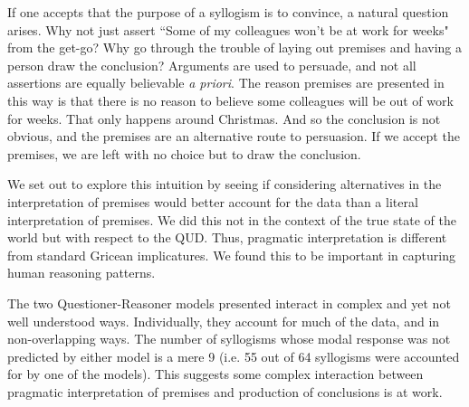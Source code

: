\documentclass[10pt,letterpaper]{article}
\begin{document}
If one accepts that the purpose of a syllogism is to convince, a natural question arises. Why not just assert ``Some of my colleagues won't be at work for weeks" from the get-go? Why go through the trouble of laying out premises and having a person draw the conclusion? Arguments are used to persuade, and not all assertions are equally believable \emph{a priori}. The reason premises are presented in this way is that there is no reason to believe some  colleagues will be out of work for weeks. That only happens around Christmas. And so the conclusion is not obvious, and the premises are an alternative route to persuasion. If we accept the premises, we are left with no choice but to draw the conclusion.

We set out to explore this intuition by seeing if considering alternatives in the interpretation of premises would better account for the data than a literal interpretation of premises. We did this not in the context of the true state of the world but with respect to the QUD. Thus, pragmatic interpretation is different from standard Gricean implicatures. We found this to be important in capturing human reasoning patterns.

The two Questioner-Reasoner models presented interact in complex and yet not well understood ways. Individually, they account for much of the data, and in non-overlapping ways. The number of syllogisms whose modal response was not predicted by either model is a mere 9 (i.e. 55 out of 64 syllogisms were accounted for by one of the models). This suggests some complex interaction between pragmatic interpretation of premises and production of conclusions is at work. 



\end{document}
